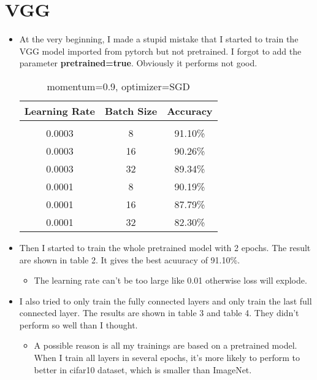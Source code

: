 \documentclass{article} %
\begin{document}
\section{VGG}
\begin{itemize}
\item At the very beginning, I made a stupid mistake that I started to train the VGG model imported from pytorch but not pretrained. I forgot to add the parameter \textbf{pretrained=true}. Obviously it performs not good.

\begin{table}[h]
\caption{momentum=0.9, optimizer=SGD}
\begin{center}
\begin{tabular}{c|c|c}
\multicolumn{1}{c}{\bf Learning Rate}&\multicolumn{1}{c}{\bf Batch Size} &\multicolumn{1}{c}{\bf Accuracy}
\\ \hline \\
0.0003 & 8 & 91.10\% \\
0.0003 & 16 & 90.26\% \\
0.0003 & 32 & 89.34\% \\
0.0001 & 8 & 90.19\% \\
0.0001 & 16 & 87.79\% \\
0.0001 & 32 & 82.30\% \\
\end{tabular}
\end{center}
\end{table}

\item Then I started to train the whole pretrained model with 2 epochs. The result are shown in table 2. It gives the best acuuracy of  91.10\%.

\begin{itemize}
\item The learning rate can't be too large like 0.01 otherwise loss will explode. 
\end{itemize}


\item I also tried to only train the fully connected layers and only train the last full connected layer. The results are shown in table 3 and table 4. They didn't perform so well than I thought.

\begin{itemize}
\item A possible reason is all my trainings are based on a pretrained model. When I train all layers in several epochs, it's more likely to perform to better in cifar10 dataset, which is smaller than ImageNet.
\end{itemize}


\end{itemize}
\end{document}
